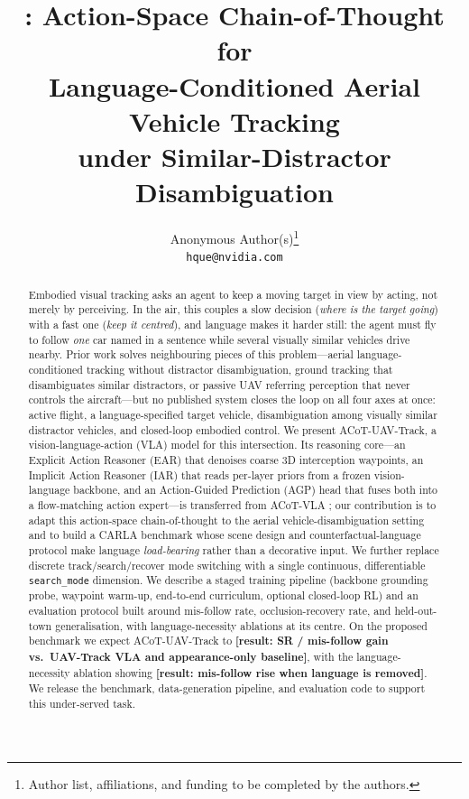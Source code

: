 \documentclass[11pt]{article}
\title{\textbf{\sys{}: Action-Space Chain-of-Thought for\\
Language-Conditioned Aerial Vehicle Tracking\\
under Similar-Distractor Disambiguation}}
\author{%
Anonymous Author(s)\thanks{Author list, affiliations, and funding to be
completed by the authors.}\\
\texttt{hque@nvidia.com}
}
\date{}
\newcommand{\ph}[1]{{\color{red}\textbf{[#1]}}}
\newcommand{\sys}{ACoT-UAV-Track}
\newcommand{\ear}{EAR}
\newcommand{\iar}{IAR}
\newcommand{\agp}{AGP}
\begin{document}
\maketitle

\begin{abstract}
Embodied visual tracking asks an agent to keep a moving target in view by
acting, not merely by perceiving. In the air, this couples a slow decision
(\emph{where is the target going}) with a fast one (\emph{keep it centred}),
and language makes it harder still: the agent must fly to follow \emph{one}
car named in a sentence while several visually similar vehicles drive nearby.
Prior work solves neighbouring pieces of this problem---aerial
language-conditioned tracking without distractor disambiguation, ground
tracking that disambiguates similar distractors, or passive UAV
referring perception that never controls the aircraft---but no published
system closes the loop on all four axes at once: active flight, a
language-specified target vehicle, disambiguation among visually similar
distractor vehicles, and closed-loop embodied control. We present
\sys{}, a vision-language-action (VLA) model for this intersection. Its
reasoning core---an Explicit Action Reasoner (\ear{}) that denoises coarse
3D interception waypoints, an Implicit Action Reasoner (\iar{}) that reads
per-layer priors from a frozen vision-language backbone, and an
Action-Guided Prediction (\agp{}) head that fuses both into a
flow-matching action expert---is transferred from ACoT-VLA
\citep{acotvla}; our contribution is to adapt this action-space
chain-of-thought to the aerial vehicle-disambiguation setting and to build
a CARLA benchmark whose scene design and counterfactual-language protocol
make language \emph{load-bearing} rather than a decorative input. We further
replace discrete track/search/recover mode switching with a single
continuous, differentiable \texttt{search\_mode} dimension. We describe a
staged training pipeline (backbone grounding probe, waypoint warm-up,
end-to-end curriculum, optional closed-loop RL) and an evaluation protocol
built around mis-follow rate, occlusion-recovery rate, and held-out-town
generalisation, with language-necessity ablations at its centre.
On the proposed benchmark we expect \sys{} to \ph{result: SR / mis-follow
gain vs.\ UAV-Track VLA and appearance-only baseline}, with the
language-necessity ablation showing \ph{result: mis-follow rise when
language is removed}. We release the benchmark, data-generation pipeline,
and evaluation code to support this under-served task.
\end{abstract}
\end{document}
